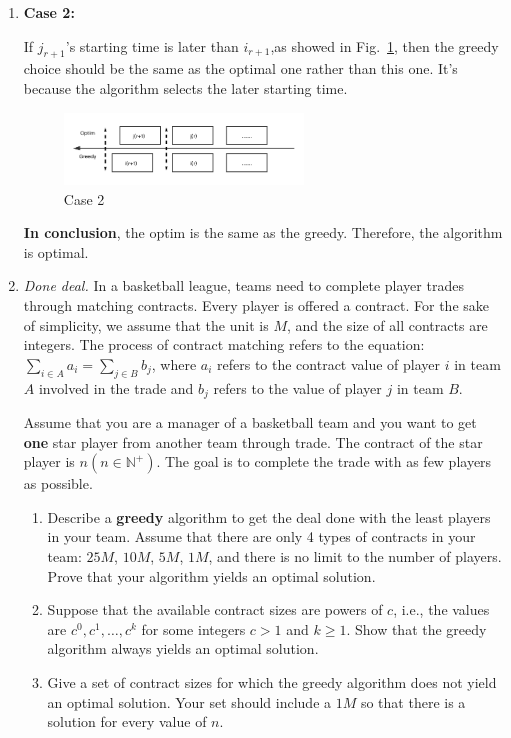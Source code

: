 \documentclass[12pt,a4paper]{article}
\makeatletter
\newtheorem*{solution}{Solution}
\theoremstyle{definition}
\renewenvironment{solution}[1][Solution] {\par\pushQED{\qed}\normalfont\topsep6\p@\@plus6\p@\relax\trivlist\item[\hskip\labelsep\bfseries#1\@addpunct{.}]\ignorespaces}{\popQED\endtrivlist\@endpefalse} \makeatother
\makeatother
\begin{document}
\begin{enumerate}
\begin{solution}
\textbf{Case 2:}

If $j_{r+1}$'s starting time is later than $i_{r+1}$,as showed in Fig.~\ref{case2}, then the greedy choice should be the same as the optimal one rather than this one. It's because the algorithm selects the later starting time.

\begin{figure}[htbp]
    \centering
    \includegraphics[width=0.6\textwidth]{case2.png}
    \caption{Case 2}\label{case2}
\end{figure}
\end{solution}

\textbf{In conclusion}, the optim is the same as the greedy. Therefore, the algorithm is optimal.	
	\item \textit{Done deal.} In a basketball league, teams need to complete player trades through matching contracts. Every player is offered a contract. For the sake of simplicity, we assume that the unit is $ M $, and the size of all contracts are integers. The process of contract matching refers to the equation: $ \sum_{i\in A} a_{i}=\sum_{j\in B} b_{j} $, where $ a_{i} $ refers to the contract value of player $ i $ in team $A$ involved in the trade and $ b_{j} $ refers to the value of player $ j $ in team $B$. 
	
	Assume that you are a manager of a basketball team and you want to get \textbf{one} star player from another team through trade. The contract of the star player is $ n (n\in \mathbb{N}^+) $. The goal is to complete the trade with as few players as possible. 
	
	\begin{enumerate}
		\item Describe a \textbf{greedy} algorithm to get the deal done with the least players in your team. Assume that there are only 4 types of contracts in your team: $25M$, $ 10M $, $ 5M $, $ 1M $, and there is no limit to the number of players. Prove that your algorithm yields an optimal solution.
		\item Suppose that the available contract sizes are powers of $c$,
		i.e., the values are $c^{0}, c^{1}, \ldots, c^{k}$ for some integers $c>1$ and $k \geq 1$. Show that the greedy algorithm always yields an optimal solution.
		\item Give a set of contract sizes for which the greedy algorithm does not yield an optimal solution. Your set should include a $ 1M $ so that there is a solution for every value of $ n $.
	\end{enumerate}
	

\end{enumerate}
\end{document}

